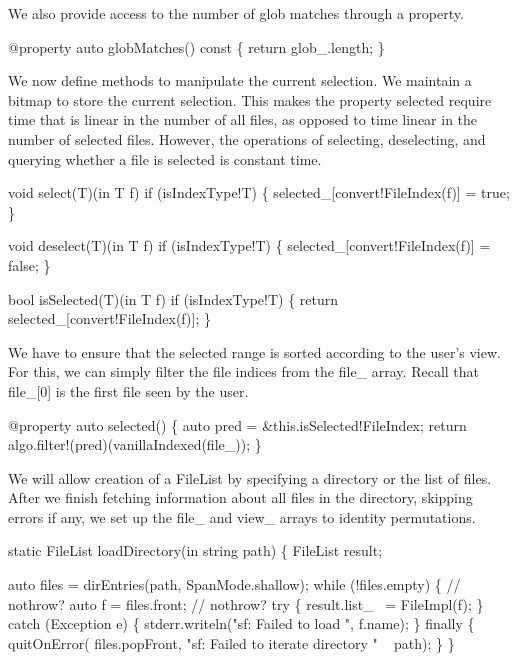 \nwendcode{}We also provide access to the number of glob matches through a
property.

\nwenddocs{}\plusendmoddef\nwstartdeflinemarkup\nwenddeflinemarkup
@property
auto globMatches() const
\{
  return glob_.length;
\}

\nwendcode{}We now define methods to manipulate the current selection. We
maintain a bitmap to store the current selection. This makes the
property {\Tt{}selected\nwendquote} require time that is linear in the number of all
files, as opposed to time linear in the number of selected
files. However, the operations of selecting, deselecting, and querying
whether a file is selected is constant time.

\nwenddocs{}\plusendmoddef\nwstartdeflinemarkup\nwenddeflinemarkup
void select(T)(in T f) if (isIndexType!T)
\{
  selected_[convert!FileIndex(f)] = true;
\}

void deselect(T)(in T f) if (isIndexType!T)
\{
  selected_[convert!FileIndex(f)] = false;
\}

bool isSelected(T)(in T f) if (isIndexType!T)
\{
  return selected_[convert!FileIndex(f)];
\}

\nwendcode{}We have to ensure that the {\Tt{}selected\nwendquote} range is sorted according to
the user's view. For this, we can simply filter the file indices from
the {\Tt{}file{\_}\nwendquote} array. Recall that {\Tt{}file{\_}[0]\nwendquote} is the first file seen
by the user.

\nwenddocs{}\plusendmoddef\nwstartdeflinemarkup\nwenddeflinemarkup
@property
auto selected()
\{
  auto pred = &this.isSelected!FileIndex;
  return algo.filter!(pred)(vanillaIndexed(file_));
\}

\nwendcode{}We will allow creation of a {\Tt{}FileList\nwendquote} by specifying a directory
or the list of files. After we finish fetching information about all
files in the directory, skipping errors if any, we set up the
{\Tt{}file{\_}\nwendquote} and {\Tt{}view{\_}\nwendquote} arrays to identity permutations.

\nwenddocs{}\endmoddef\nwstartdeflinemarkup\nwenddeflinemarkup
static FileList loadDirectory(in string path)
\{
  FileList result;

  auto files = dirEntries(path, SpanMode.shallow);
  while (!files.empty) \{ // nothrow?
    auto f = files.front; // nothrow?
    try \{
      result.list_ ~= FileImpl(f);
    \} catch (Exception e) \{
      stderr.writeln("sf: Failed to load ", f.name);
    \} finally \{
      quitOnError(
        files.popFront,
        "sf: Failed to iterate directory " ~ path);
    \}
  \}

